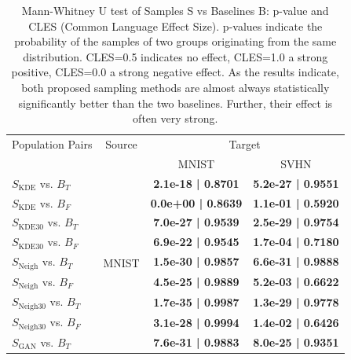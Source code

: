 \begin{table}[ht!]
\begin{minipage}[t]{0.98\textwidth}
\centering
{\small
\caption{Mann-Whitney U test of Samples S vs Baselines B: p-value and CLES (Common Language Effect Size). p-values indicate the probability of the samples of two groups originating from the same distribution. CLES=0.5 indicates no effect, CLES=1.0 a strong positive, CLES=0.0 a strong negative effect.
As the results indicate, both proposed sampling methods are almost always statistically significantly better than the two baselines. Further, their effect is often very strong. 
}
\begin{tabularx}{0.6\linewidth}{@{}lccc@{}}
\toprule
Population Pairs                 & Source                  & \multicolumn{2}{c}{Target}                            \\
\cmidrule(rl){1-1} \cmidrule(rl){2-2}  \cmidrule(rl){3-4} 
                                 &                         & MNIST                     & SVHN                      \\
 \cmidrule(rl){3-3} \cmidrule(rl){4-4}
$S_{\text{KDE}}$ vs. $B_{T}$     & \multirow{12}{*}{MNIST} & \textbf{2.1e-18 | 0.8701} & \textbf{5.2e-27 | 0.9551} \\
$S_{\text{KDE}}$ vs. $B_{F}$     &                         & \textbf{0.0e+00 | 0.8639} & \textbf{1.1e-01 | 0.5920} \\
$S_{\text{KDE}30}$ vs. $B_{T}$   &                         & \textbf{7.0e-27 | 0.9539} & \textbf{2.5e-29 | 0.9754} \\
$S_{\text{KDE}30}$ vs. $B_{F}$   &                         & \textbf{6.9e-22 | 0.9545} & \textbf{1.7e-04 | 0.7180} \\
$S_{\text{Neigh}}$ vs. $B_{T}$   &                         & \textbf{1.5e-30 | 0.9857} & \textbf{6.6e-31 | 0.9888} \\
$S_{\text{Neigh}}$ vs. $B_{F}$   &                         & \textbf{4.5e-25 | 0.9889} & \textbf{5.2e-03 | 0.6622} \\
$S_{\text{Neigh}30}$ vs. $B_{T}$ &                         & \textbf{1.7e-35 | 0.9987} & \textbf{1.3e-29 | 0.9778} \\
$S_{\text{Neigh}30}$ vs. $B_{F}$ &                         & \textbf{3.1e-28 | 0.9994} & \textbf{1.4e-02 | 0.6426} \\
$S_{\text{GAN}}$ vs. $B_{T}$     &                         & \textbf{7.6e-31 | 0.9883} & \textbf{8.0e-25 | 0.9351} \\

\end{tabularx}}
\end{minipage}
\end{table}
